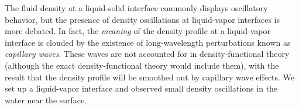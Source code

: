 \documentclass[letterpaper,twocolumn,amsmath,amssymb,prb]{revtex4-1}
\newcommand{\fixme}[1]{\textcolor{red}{[\emph{#1}]}}
\begin{document}

The fluid density at a liquid-solid interface commonly displays
oscillatory behavior, but the presence of density oscillations at
liquid-vapor interfaces is more debated\cite{penfold2001structure}.
In fact, the \emph{meaning} of the density profile at a liquid-vapor
interface is clouded by the existence of long-wavelength perturbations
known as \emph{capillary waves}.  These waves are not accounted for in
density-functional theory (although the exact
density-functional theory would include them), with the result
that the density profile will be smoothed out by capillary wave
effects. We set up a liquid-vapor interface and observed small density
oscillations in the water near the surface.
\end{document}
